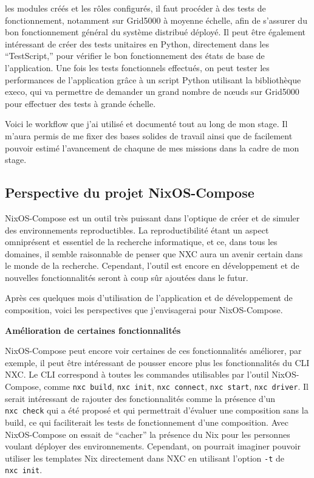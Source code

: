 \documentclass[a4paper,french,12pt, titlepage]{article}
\begin{document}
\begin{itemize}
  les modules créés et les rôles configurés, il faut procéder à des
  tests de fonctionnement, notamment sur Grid5000 à moyenne échelle,
  afin de s'assurer du bon fonctionnement général du système distribué
  déployé. Il peut être également intéressant de créer des tests
  unitaires en Python, directement dans les ``TestScript,'' pour
  vérifier le bon fonctionnement des états de base de l'application. Une
  fois les tests fonctionnels effectués, on peut tester les performances
  de l'application grâce à un script Python utilisant la bibliothèque
  execo, qui va permettre de demander un grand nombre de nœuds sur
  Grid5000 pour effectuer des tests à grande échelle.\newline
\end{itemize}

Voici le workflow que j'ai utilisé et documenté tout au long de mon
stage. Il m'aura permis de me fixer des bases solides de travail ainsi
que de facilement pouvoir estimé l'avancement de chaqune de mes missions
dans la cadre de mon stage.

\newpage

\hypertarget{perspective-du-projet-nixos-compose}{%
\subsection{Perspective du projet
NixOS-Compose}\label{perspective-du-projet-nixos-compose}}

NixOS-Compose est un outil très puissant dans l'optique de créer et de
simuler des environnements reproductibles. La reproductibilité étant un
aspect omniprésent et essentiel de la recherche informatique, et ce,
dans tous les domaines, il semble raisonnable de penser que NXC aura un
avenir certain dans le monde de la recherche. Cependant, l'outil est
encore en développement et de nouvelles fonctionnalités seront à coup
sûr ajoutées dans le futur.

Après ces quelques mois d'utilisation de l'application et de
développement de composition, voici les perspectives que j'envisagerai
pour NixOS-Compose.\newline

\textbf{Amélioration de certaines fonctionnalités}\newline

NixOS-Compose peut encore voir certaines de ces fonctionnalités
améliorer, par exemple, il peut être intéressant de pousser encore plus
les fonctionnalités du CLI NXC. Le CLI correspond à toutes les commandes
utilisables par l'outil NixOS-Compose, comme \texttt{nxc\ build},
\texttt{nxc\ init}, \texttt{nxc\ connect}, \texttt{nxc\ start},
\texttt{nxc\ driver}. Il serait intéressant de rajouter des
fonctionnalités comme la présence d'un \texttt{nxc\ check} qui a été
proposé et qui permettrait d'évaluer une composition sans la build, ce
qui faciliterait les tests de fonctionnement d'une composition. Avec
NixOS-Compose on essait de ``cacher'' la présence du Nix pour les
personnes voulant déployer des environnements. Cependant, on pourrait
imaginer pouvoir utiliser les templates Nix directement dans NXC en
utilisant l'option \texttt{-t} de \texttt{nxc\ init}.\newline
\end{document}
